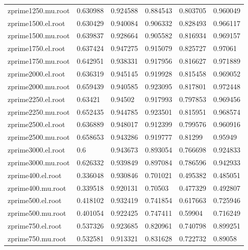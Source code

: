 \begin{table}[H]
\begin{tabular}{l|lllll}
    zprime1250.mu.root & 0.630988   & 0.924588 & 0.884543 & 0.803705 & 0.960049  \\
    zprime1500.el.root & 0.630429   & 0.940084 & 0.906332 & 0.828493 & 0.966117  \\
    zprime1500.mu.root & 0.639837   & 0.928664 & 0.905582 & 0.816934 & 0.969157  \\
    zprime1750.el.root & 0.637424   & 0.947275 & 0.915079 & 0.825727 & 0.97061   \\
    zprime1750.mu.root & 0.642951   & 0.938331 & 0.917956 & 0.816627 & 0.971889  \\
    zprime2000.el.root & 0.636319   & 0.945145 & 0.919928 & 0.815458 & 0.969052  \\
    zprime2000.mu.root & 0.659439   & 0.940585 & 0.923095 & 0.817801 & 0.972448  \\
    zprime2250.el.root & 0.63421    & 0.94502  & 0.917993 & 0.797853 & 0.969456  \\
    zprime2250.mu.root & 0.652435   & 0.944785 & 0.923501 & 0.815951 & 0.968574  \\
    zprime2500.el.root & 0.636889   & 0.948017 & 0.912399 & 0.799576 & 0.960916  \\
    zprime2500.mu.root & 0.658653   & 0.943286 & 0.919777 & 0.81299  & 0.95949   \\
    zprime3000.el.root & 0.6        & 0.943673 & 0.893054 & 0.766698 & 0.924833  \\
    zprime3000.mu.root & 0.626332   & 0.939849 & 0.897084 & 0.786596 & 0.942933  \\
    zprime400.el.root  & 0.336048   & 0.930846 & 0.701021 & 0.495382 & 0.485051  \\
    zprime400.mu.root  & 0.339518   & 0.920131 & 0.70503  & 0.477329 & 0.492807  \\
    zprime500.el.root  & 0.418102   & 0.932419 & 0.741854 & 0.617663 & 0.725946  \\
    zprime500.mu.root  & 0.401054   & 0.922425 & 0.747411 & 0.59904  & 0.716249  \\
    zprime750.el.root  & 0.537326   & 0.923685 & 0.820961 & 0.740798 & 0.899251  \\
    zprime750.mu.root  & 0.532581   & 0.913321 & 0.831628 & 0.722732 & 0.89058  
  \end{tabular}
  \label{tab:eff_a}

\end{table}

